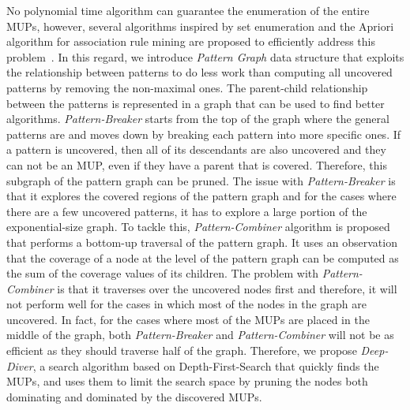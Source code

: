 \documentclass[11pt]{article}
\begin{document}
No polynomial time algorithm can guarantee the enumeration of the entire MUPs, however, several algorithms inspired by set enumeration and the Apriori algorithm for association rule mining are proposed to efficiently address this problem~\cite{asudeh2019assessing}.
In this regard, we introduce \textit{Pattern Graph} data structure that exploits the relationship between patterns to do less work than computing all uncovered patterns by removing the non-maximal ones. 
The parent-child relationship between the patterns is represented in a graph that can be used to find better algorithms. 
\textit{Pattern-Breaker} starts from the top of the graph where the general patterns are and moves down by breaking each pattern into more specific ones. If a pattern is uncovered, then all of its descendants are also uncovered and they can not be an MUP, even if they have a parent that is covered. Therefore, this subgraph of the pattern graph can be pruned. 
The issue with \textit{Pattern-Breaker} is that it explores the covered regions of the pattern graph and for the cases where there are a few uncovered patterns, it has to explore a large portion of the exponential-size graph. 
To tackle this, \textit{Pattern-Combiner} algorithm is proposed that performs a bottom-up traversal of the pattern graph. It uses an observation that the coverage of a node at the level of the pattern graph can be computed as the sum of the coverage values of its children. 
The problem with \textit{Pattern-Combiner} is that it traverses over the uncovered nodes first and therefore, it will not perform well for the cases in which most of the nodes in the graph are uncovered. 
In fact, for the cases where most of the MUPs are placed in the middle of the graph, both \textit{Pattern-Breaker} and \textit{Pattern-Combiner} will not be as efficient as they should traverse half of the graph. Therefore, we propose \textit{Deep-Diver}, a search algorithm based on Depth-First-Search that quickly finds the MUPs, and uses them to limit the search space by pruning the nodes both dominating and dominated by the discovered MUPs.
\end{document}
